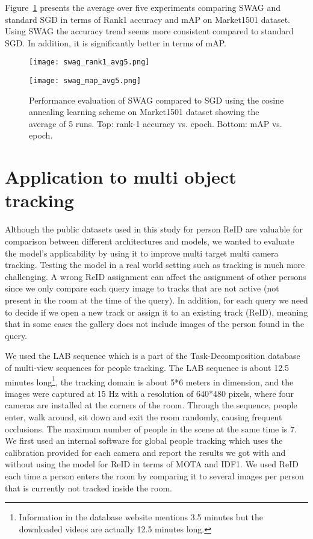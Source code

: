 \documentclass[sigconf]{acmart}
\begin{document}
Figure~\ref{fig:SWAG} presents the average over five experiments comparing SWAG and standard SGD in terms of Rank1 accuracy and mAP on Market1501 dataset. Using SWAG the accuracy trend seems more consistent compared to standard SGD. In addition, it is significantly better in terms of mAP.

\begin{figure}
\label{fig:swag_market}
\centering
\begin{minipage}[b]{0.4\textwidth}
\texttt{[image: swag\_rank1\_avg5.png]}
\end{minipage}

\centering
\begin{minipage}[b]{0.4\textwidth}
\texttt{[image: swag\_map\_avg5.png]}
\end{minipage}
\caption{Performance evaluation of SWAG compared to SGD using the cosine annealing learning scheme on Market1501 dataset showing the average of 5 runs. Top: rank-1 accuracy vs. epoch. Bottom: mAP vs. epoch.}\label{fig:SWAG}
\end{figure}

\section{Application to multi object tracking}
\label{sec:tracking}
Although the public datasets used in this study for person ReID are valuable for comparison between different architectures and models, we wanted to evaluate the model's applicability by using it to improve multi target multi camera tracking. Testing the model in a real world setting such as tracking is much more challenging. A wrong ReID assignment can affect the assignment of other persons since we only compare each query image to tracks that are not active (not present in the room at the time of the query). In addition, for each query we need to decide if we open a new track or assign it to an existing track (ReID), meaning that in some cases the gallery does not include images of the person found in the query.

We used the LAB sequence which is a part of the Task-Decomposition database \cite{hu2014dynamic} of multi-view sequences for people tracking. The LAB sequence is about 12.5 minutes long\footnote{Information in the database website mentions 3.5 minutes but the downloaded videos are actually 12.5 minutes long.}, the tracking domain is about 5*6 meters in dimension, and the images were captured at 15 Hz with a resolution of 640*480 pixels, where four cameras are installed at the corners of the room. Through the sequence, people enter, walk around, sit down and exit the room randomly, causing frequent occlusions. The maximum number of people in the scene at the same time is 7.
We first used an internal software for global people tracking which uses the calibration provided for each camera and report the results we got with and without using the model for ReID in terms of MOTA and IDF1. We used ReID each time a person enters the room by comparing it to several images per person that is currently not tracked inside the room.
\end{document}
